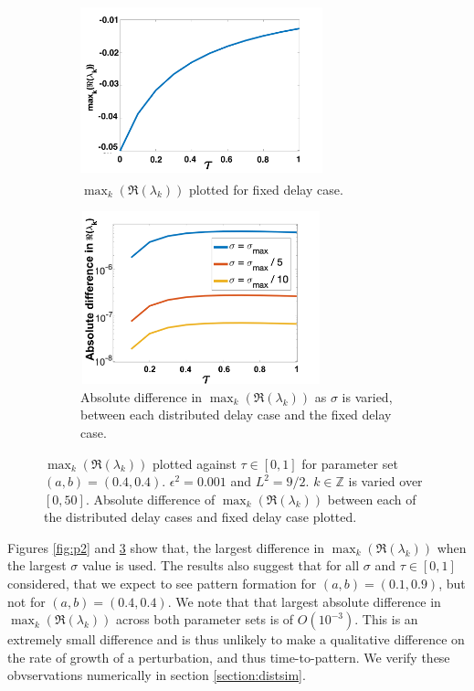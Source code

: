 \begin{figure}[H]
    \centering
    \begin{subfigure}[t]{0.45\textwidth}
        \centering
        \includegraphics[width=7cm,height=5cm]{p3fixed.png}
        \caption{$\max_k(\Re(\lambda_k))$ plotted for fixed delay case.}
        \label{}
    \end{subfigure}
    \hfill
    \begin{subfigure}[t]{0.45\textwidth}
        \centering
        \includegraphics[width=7cm,height=5cm]{dispdiff2.png}
        \caption{Absolute difference in $\max_k(\Re(\lambda_k))$ as $\sigma$ is varied, between each distributed delay case and the fixed delay case.}
        \label{}
    \end{subfigure}
    \caption{$\max_k(\Re(\lambda_k))$ plotted against $\tau\in[0,1]$ for parameter set $(a,b)=(0.4,0.4)$. $\epsilon^2=0.001$ and $L^2=9/2$. $k\in\mathbb{Z}$ is varied over $[0,50]$. Absolute difference of $\max_k(\Re(\lambda_k))$ between each of the distributed delay cases and fixed delay case plotted.}
    \label{fig:p3}
\end{figure}

Figures \ref{fig:p2} and \ref{fig:p3} show that, the largest difference in $\max_k(\Re(\lambda_k))$ when the largest $\sigma$ value is used. The results also suggest that for all $\sigma$ and $\tau\in[0,1]$ considered, that we expect to see pattern formation for $(a,b)=(0.1,0.9)$, but not for $(a,b)=(0.4,0.4)$. We note that that largest absolute difference in $\max_k(\Re(\lambda_k))$ across both parameter sets is of $O(10^{-3})$. This is an extremely small difference and is thus unlikely to make a qualitative difference on the rate of growth of a perturbation, and thus time-to-pattern. We verify these obvservations numerically in section \ref{section:distsim}.

